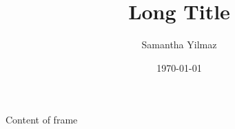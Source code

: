 \documentclass{beamer}
\author{Samantha Yilmaz}
\date{\today}
\title[Short Title]{Long Title}
\begin{document}
	\frame{\maketitle}

	\begin{frame}
		\frametitle{}
		\framesubtitle{}
		
		Content of frame
	\end{frame}
\end{document}
